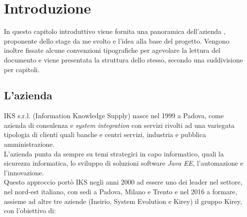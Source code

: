 
\chapter{Introduzione}
\label{cap:introduzione}

In questo capitolo introduttivo viene fornita una panoramica dell’azienda \myCompany, proponente dello stage da me svolto e l’idea alla base del progetto.
Vengono inoltre fissate alcune convenzioni tipografiche per agevolare la lettura del documento e viene presentata la struttura dello stesso, secondo una suddivisione per capitoli.




\section{L'azienda}

IKS s.r.l. (Information Knowledge Supply) nasce nel 1999 a Padova, come azienda di 
consulenza e \textit{\gls{system integration}} con servizi rivolti ad una variegata tipologia di clienti quali banche e centri servizi, industria e pubblica amministrazione.\\

L'azienda punta da sempre su temi strategici in capo informatico, quali la sicurezza informatica, lo sviluppo di soluzioni software \textit{\gls{Java EE}}, l'automazione e l'innovazione. \\

Questo approccio portò IKS negli anni 2000 ad essere uno dei leader nel settore, nel nord-est italiano, con sedi a Padova, Milano e Trento e nel 2016 a formare, assieme ad altre tre aziende (Insirio, System Evolution e Kirey) il gruppo Kirey, con l'obiettivo di:


